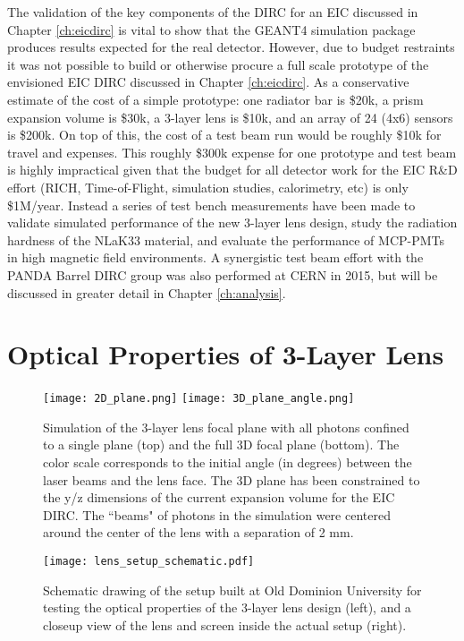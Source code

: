 \label{ch:components}
The validation of the key components of the DIRC for an EIC discussed in Chapter \ref{ch:eicdirc} is vital to show that the GEANT4 simulation package produces results expected for the real detector. However, due to budget restraints it was not possible to build or otherwise procure a full scale prototype of the envisioned EIC DIRC discussed in Chapter \ref{ch:eicdirc}. As a conservative estimate of the cost of a simple prototype: one radiator bar is \$20k, a prism expansion volume is \$30k, a 3-layer lens is \$10k, and an array of 24 (4x6) sensors is \$200k. On top of this, the cost of a test beam run would be roughly \$10k for travel and expenses.  This roughly \$300k expense for one prototype and test beam is highly impractical given that the budget for all detector work for the EIC R\&D effort (RICH, Time-of-Flight, simulation studies, calorimetry, etc) is only \$1M/year. Instead a series of test bench measurements have been made to validate simulated performance of the new 3-layer lens design, study the radiation hardness of the NLaK33 material, and evaluate the performance of MCP-PMTs in high magnetic field environments. A synergistic test beam effort with the PANDA Barrel DIRC group was also performed at CERN in 2015, but will be discussed in greater detail in Chapter \ref{ch:analysis}.

\section{Optical Properties of 3-Layer Lens}
\begin{figure}[!htb]
	\centering
	\texttt{[image: 2D\_plane.png]}
	\texttt{[image: 3D\_plane\_angle.png]}
	\caption{Simulation of the 3-layer lens focal plane with all photons confined to a single plane (top) and the full 3D focal plane (bottom). The color scale corresponds to the initial angle (in degrees) between the laser beams and the lens face. The 3D plane has been constrained to the y/z dimensions of the current expansion volume for the EIC DIRC. The ``beams" of photons in the simulation were centered around the center of the lens with a separation of 2 mm.}
	\label{fig:focalplane_sim}
\end{figure}
\begin{figure}[!htb]
	\centering
	\texttt{[image: lens\_setup\_schematic.pdf]}
	\caption{Schematic drawing of the setup built at Old Dominion University for testing the optical properties of the 3-layer lens design (left), and a closeup view of the lens and screen inside the actual setup (right).}
	\label{fig:ODU_setup}
\end{figure}

